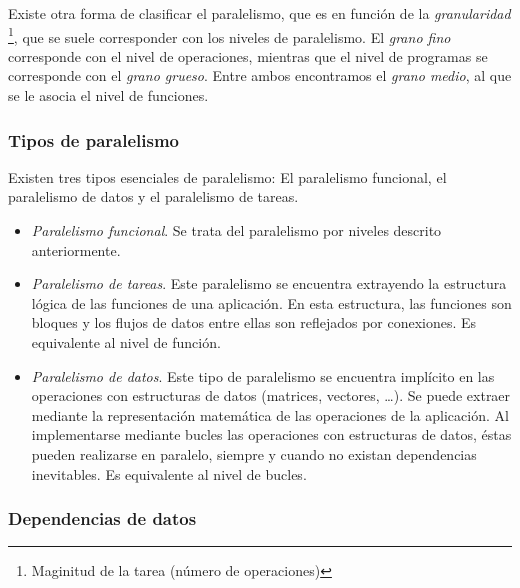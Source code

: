\documentclass[11pt,twoside,titlepage,a4paper]{article}
\begin{document}
Existe otra forma de clasificar el paralelismo, que es en función de la \textit{granularidad}
\footnote{Maginitud de la tarea (número de operaciones)}, que se suele corresponder con los niveles de
paralelismo. El \textit{grano fino} corresponde con el nivel de operaciones, mientras que el nivel de
programas se corresponde con el \textit{grano grueso}. Entre ambos encontramos el \textit{grano medio}, al
que se le asocia el nivel de funciones.

\subsubsection*{Tipos de paralelismo}

Existen tres tipos esenciales de paralelismo: El paralelismo funcional, el paralelismo de datos y el
paralelismo de tareas.
\begin{itemize}[noitemsep]
	\item \textit{Paralelismo funcional}. Se trata del paralelismo por niveles descrito anteriormente.
	\item \textit{Paralelismo de tareas}. Este paralelismo se encuentra extrayendo la estructura lógica de
	las funciones de una aplicación. En esta estructura, las funciones son bloques y los flujos de datos
	entre ellas son reflejados por conexiones. Es equivalente al nivel de función.
	\item \textit{Paralelismo de datos}. Este tipo de paralelismo se encuentra implícito en las operaciones
	con estructuras de datos (matrices, vectores, \dots). Se puede extraer mediante la representación
	matemática de las operaciones de la aplicación. Al implementarse mediante bucles las operaciones con
	estructuras de datos, éstas pueden realizarse en paralelo, siempre y cuando no existan dependencias
	inevitables. Es equivalente al nivel de bucles.
\end{itemize}

\subsubsection*{Dependencias de datos}
\end{document}
